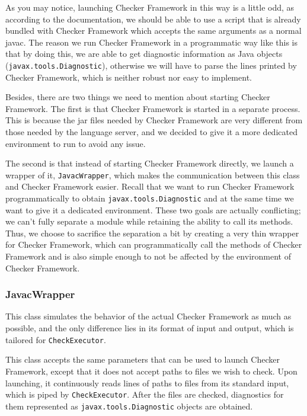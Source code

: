 \documentclass{article}
\begin{document}
As you may notice, launching Checker Framework in this way is a little odd, as
according to the documentation, we should be able to use a script that is
already bundled with Checker Framework which accepts the same arguments as a
normal javac. The reason we run Checker Framework in a programmatic way like
this is that by doing this, we are able to get diagnostic information as Java
objects (\verb|javax.tools.Diagnostic|), otherwise we will have to parse the
lines printed by Checker Framework, which is neither robust nor easy to
implement.

Besides, there are two things we need to mention about starting Checker
Framework. The first is that Checker Framework is started in a separate process.
This is because the jar files needed by Checker Framework are very different
from those needed by the language server, and we decided to give it a more
dedicated environment to run to avoid any issue.

The second is that instead of starting Checker Framework directly, we launch a
wrapper of it, \verb|JavacWrapper|, which makes the communication between this
class and Checker Framework easier. Recall that we want to run Checker Framework
programmatically to obtain \verb|javax.tools.Diagnostic| and at the same time we
want to give it a dedicated environment. These two goals are actually
conflicting; we can't fully separate a module while retaining the ability to
call its methods. Thus, we choose to sacrifice the separation a bit by creating
a very thin wrapper for Checker Framework, which can programmatically call the
methods of Checker Framework and is also simple enough to not be affected by the
environment of Checker Framework.

\subsubsection{JavacWrapper}

This class simulates the behavior of the actual Checker Framework as much as
possible, and the only difference lies in its format of input and output, which
is tailored for \verb|CheckExecutor|.

This class accepts the same parameters that can be used to launch Checker
Framework, except that it does not accept paths to files we wish to check. Upon
launching, it continuously reads lines of paths to files from its standard
input, which is piped by \verb|CheckExecutor|. After the files are checked,
diagnostics for them represented as \verb|javax.tools.Diagnostic| objects are
obtained.
\end{document}
